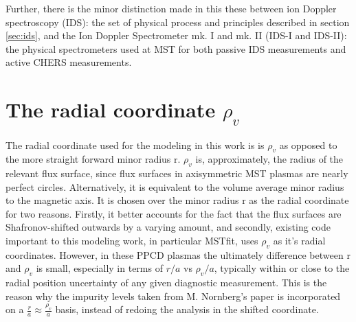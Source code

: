 \begin{refsection}
Further, there is the minor distinction made in this these between ion Doppler spectroscopy (IDS): the set of physical process and principles described in section \ref{sec:ids}, and the Ion Doppler Spectrometer mk. I and mk. II (IDS-I and IDS-II): the physical spectrometers used at MST for both passive IDS measurements and active CHERS measurements.

\section{The radial coordinate $\rho_v$}\label{app:rhov}

The radial coordinate used for the modeling in this work is is $\rho_v$ as opposed to the more straight forward minor radius r. $\rho_v$ is, approximately, the radius of the relevant flux surface, since flux surfaces in axisymmetric MST plasmas are nearly perfect circles. Alternatively, it is equivalent to the volume average minor radius to the magnetic axis. It is chosen over the minor radius r as the radial coordinate for two reasons. Firstly, it better accounts for the fact that the flux surfaces are Shafronov-shifted outwards by a varying amount, and secondly, existing code important to this modeling work, in particular MSTfit, uses $\rho_v$ as it's radial coordinates. However, in these PPCD plasmas the ultimately difference between r and $\rho_v$ is small, especially in terms of $r/a$ vs $\rho_v/a$, typically within or close to the radial position uncertainty of any given diagnostic measurement. This is the reason why the impurity levels taken from M. Nornberg's paper\cite{Nornberg2018} is incorporated on a $\frac{r}{a}\approx\frac{\rho_v}{a}$ basis, instead of redoing the analysis in the shifted coordinate. 


\printbibliography
\end{refsection}